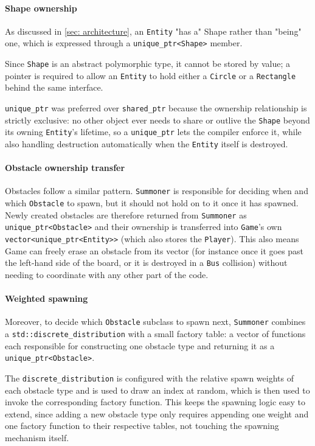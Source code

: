 \documentclass{article}
\begin{document}
\paragraph{Shape ownership} As discussed in \ref{sec: architecture}, an \texttt{Entity} "has a" Shape rather than "being" one, which is expressed through a \texttt{unique\_ptr<Shape>} member. 

Since \texttt{Shape} is an abstract polymorphic type, it cannot be stored by value; a pointer is required to allow an \texttt{Entity} to hold either a \texttt{Circle} or a \texttt{Rectangle} behind the same interface. 

\texttt{unique\_ptr} was preferred over \texttt{shared\_ptr} because the ownership relationship is strictly exclusive: no other object ever needs to share or outlive the \texttt{Shape} beyond its owning \texttt{Entity}'s lifetime, so a \texttt{unique\_ptr} lets the compiler enforce it, while also handling destruction automatically when the \texttt{Entity} itself is destroyed.

\paragraph{Obstacle ownership transfer} 
Obstacles follow a similar pattern. \texttt{Summoner} is responsible for deciding when and which \texttt{Obstacle} to spawn, but it should not hold on to it once it has spawned. Newly created obstacles are therefore returned from \texttt{Summoner} as \texttt{unique\_ptr<Obstacle>} and their ownership is transferred into \texttt{Game}'s own \texttt{vector<unique\_ptr<Entity>>} (which also stores the \texttt{Player}). This also means Game can freely erase an obstacle from its vector (for instance once it goes past the left-hand side of the board, or it is destroyed in a \texttt{Bus} collision) without needing to coordinate with any other part of the code.

\paragraph{Weighted spawning} Moreover, to decide which \texttt{Obstacle} subclass to spawn next, \texttt{Summoner} combines a \texttt{std::discrete\_distribution} with a small factory table: a vector of functions each responsible for constructing one obstacle type and returning it as a \texttt{unique\_ptr<Obstacle>}. 

The \texttt{discrete\_distribution} is configured with the relative spawn weights of each obstacle type and is used to draw an index at random, which is then used to invoke the corresponding factory function. This keeps the spawning logic easy to extend, since adding a new obstacle type only requires appending one weight and one factory function to their respective tables, not touching the spawning mechanism itself.
\end{document}
